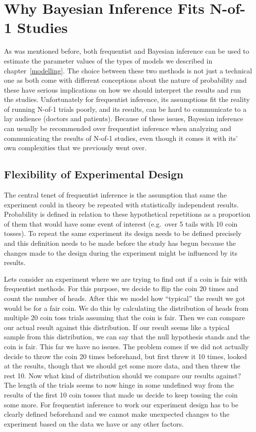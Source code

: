 \documentclass[12pt,a4paper,leqno]{report}
\theoremstyle{plain}
\theoremstyle{definition}
\theoremstyle{remark}
\begin{document}
\section{Why Bayesian Inference Fits N-of-1 Studies}\label{whybayes}

As was mentioned before, both frequentist and Bayesian inference can be used to
estimate the parameter values of the types of models we described
in chapter\ \ref{modelling}. The choice between these two methods is not just a
technical one as both come with different conceptions about the nature of probability
and these have serious implications on how we should interpret the results and run the studies.
Unfortunately for frequentist inference, its assumptions fit the reality of running
N-of-1 trials poorly, and its results, can be hard to communicate to a lay
audience (doctors and patients). Because of these issues, Bayesian inference
can usually be recommended over frequentist inference when analyzing and
communicating the results of N-of-1 studies, even though it comes it with its'
own complexities that we previously went over.

\subsection{Flexibility of Experimental Design}\label{whybayes}

The central tenet of frequentist inference is the assumption that same the
experiment could in theory be repeated with statistically independent results. Probability
is defined in relation to these hypothetical repetitions as a proportion of them
that would have some event of interest (e.g.\ over 5 tails with 10 coin tosses).
To repeat the same experiment its design needs to be defined precisely and this
definition needs to be made before the study has begun because the changes made
to the design during the experiment might be influenced by its results.

Lets consider an experiment where we are trying to find out if a coin
is fair with frequentist methods. For this purpose, we decide to flip the coin 20 times
and count the number of heads. After this we model how ``typical'' the result we got
would be for a fair coin. We do this by calculating the distribution of heads from
multiple 20 coin toss trials
assuming that the coin is fair. Then we can compare our actual result against this
distribution. If our result seems like a typical sample from this distribution, we
can say that the null hypothesis stands and the coin is fair. This far we have no
issues. The problem comes if we did not actually decide to throw the coin 20 times
beforehand, but first threw it 10 times, looked at the results, though that we
should get some more data, and then threw the rest 10. Now what
kind of distribution should we compare our results against? The length of the trials
seems to now hinge in some undefined way from the results of the first 10 coin tosses
that made us decide to keep tossing the coin some more. For frequentist inference to
work our experiment design has to be clearly defined beforehand and we cannot make
unexpected changes to the experiment based on the data we have or any other factors.
\end{document}
